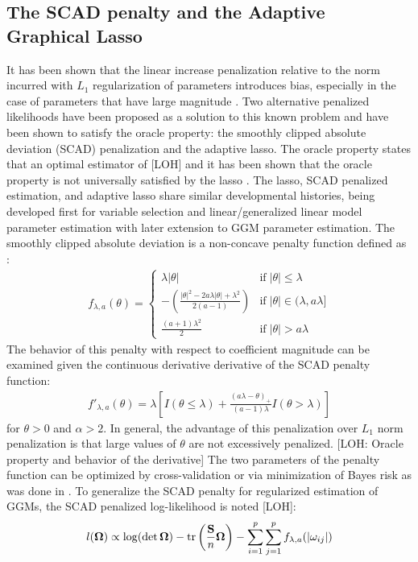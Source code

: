 \begin{DoubleSpace*}
\subsection{The SCAD penalty and the Adaptive Graphical Lasso}
It has been shown that the linear increase penalization relative to the norm incurred with $L_1$ regularization of parameters introduces bias, especially in the case of parameters that have large magnitude \cite{fan2009,lam2009}. Two alternative penalized likelihoods have been proposed as a solution to this known problem and have been shown to satisfy the oracle property: the smoothly clipped absolute deviation (SCAD) penalization and the adaptive lasso. The oracle property states that an optimal estimator of [LOH] and it has been shown that the oracle property is not universally satisfied by the lasso \cite{zou2006}. The lasso, SCAD penalized estimation, and adaptive lasso share similar developmental histories, being developed first for variable selection and linear/generalized linear model parameter estimation with later extension to GGM parameter estimation. The smoothly clipped absolute deviation is a non-concave penalty function defined as \cite{fan2001}:
\begin{align}
f_{\lambda,a}(\theta)=
\begin{cases} 
\lambda |\theta| & \text{if} \; |\theta|\leq \lambda \\
-\left(\frac{|\theta|^2 -2a \lambda |\theta|+\lambda^2}{2(a-1)}\right)& \text{if}\; |\theta| \in (\lambda,a \lambda] \\
\frac{(a+1)\lambda^2}{2} & \text{if} \; |\theta|>a \lambda 
\end{cases}
\end{align}
The behavior of this penalty with respect to coefficient magnitude can be examined given the continuous derivative derivative of the SCAD penalty function:
\begin{align}
f'_{\lambda,a}(\theta)=\lambda \left[I(\theta \leq \lambda) + \frac{(a \lambda-\theta)_+}{(a-1)\lambda}I(\theta>\lambda)\right]
\end{align}
for $\theta > 0$ and $\alpha>2$. In general, the advantage of this penalization over $L_1$ norm penalization is that large values of $\theta$ are not excessively penalized. [LOH: Oracle property and behavior of the derivative] The two parameters of the penalty function can be optimized by cross-validation or via minimization of Bayes risk as was done in \cite{fan2001}. To generalize the SCAD penalty for regularized estimation of GGMs, the SCAD penalized log-likelihood is noted [LOH]:
\begin{align*}
l(\boldsymbol{\Omega}) \propto \log(\det \boldsymbol{\Omega})-\operatorname{tr} \left(\frac{\textbf{S}}{n} \boldsymbol{\Omega} \right) - \sum_{i=1}^{p} \sum_{j=1}^{p} f_{\lambda,a} (|\omega_{ij}|)
\end{align*}


\end{DoubleSpace*}

